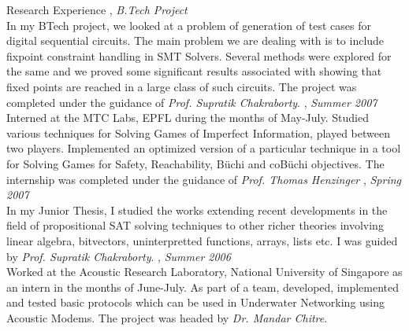 \documentclass[final]{resume}
\begin{document}
\begin{category}{Research Experience}
, \emph{B.Tech Project}\\
In my BTech project, we looked at a problem of generation of test cases for digital sequential circuits. The main problem we are dealing with is to include fixpoint constraint handling in SMT Solvers. Several methods were explored for the same and we proved some significant results associated with showing that fixed points are reached in a large class of such circuits. The project was completed under the guidance of \emph{Prof. Supratik Chakraborty}.
, \emph{Summer 2007}\\
Interned at the MTC Labs, EPFL during the months of May-July. Studied various techniques for Solving Games of Imperfect Information, played between two players. Implemented an optimized version of a particular technique in a tool for Solving Games for Safety, Reachability, B\"{u}chi and coB\"{u}chi objectives. The internship was completed under the guidance of \emph{Prof. Thomas Henzinger}
, \emph{Spring 2007}\\
In my Junior Thesis, I studied the works extending recent developments in the field of propositional SAT solving techniques to other richer theories involving linear algebra, bitvectors, uninterpretted functions, arrays, lists etc. I was guided by \emph{Prof. Supratik Chakraborty}.
, \emph{Summer 2006}\\
Worked at the Acoustic Research Laboratory, National University of Singapore as an intern in the months of June-July. As part of a team, developed, implemented and tested basic protocols which can be used in Underwater Networking using Acoustic Modems. The project was headed by \emph{Dr. Mandar Chitre}.
\end{category}
\pagebreak


\end{document}
